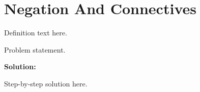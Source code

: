 \section{Negation And Connectives}


\begin{definition}[Term]
Definition text here.
\end{definition}

\begin{example}
Problem statement.

\textbf{Solution:}

Step-by-step solution here.
\end{example}
